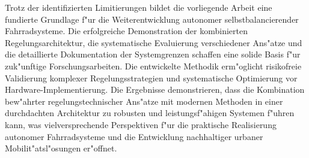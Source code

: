 Trotz der identifizierten Limitierungen bildet die vorliegende Arbeit eine fundierte Grundlage f{"u}r die Weiterentwicklung autonomer 
selbstbalancierender Fahrradsysteme. Die erfolgreiche Demonstration der kombinierten Regelungsarchitektur, die systematische 
Evaluierung verschiedener Ans{"a}tze und die detaillierte Dokumentation der Systemgrenzen schaffen eine solide Basis f{"u}r zuk{"u}nftige 
Forschungsarbeiten. Die entwickelte Methodik erm{"o}glicht risikofreie Validierung komplexer Regelungsstrategien und systematische 
Optimierung vor Hardware-Implementierung. Die Ergebnisse demonstrieren, dass die Kombination bew{"a}hrter regelungstechnischer 
Ans{"a}tze mit modernen Methoden in einer durchdachten Architektur zu robusten und leistungsf{"a}higen Systemen f{"u}hren kann, was 
vielversprechende Perspektiven f{"u}r die praktische Realisierung autonomer Fahrradsysteme und die Entwicklung nachhaltiger urbaner 
Mobilit{"a}tsl{"o}sungen er{"o}ffnet.